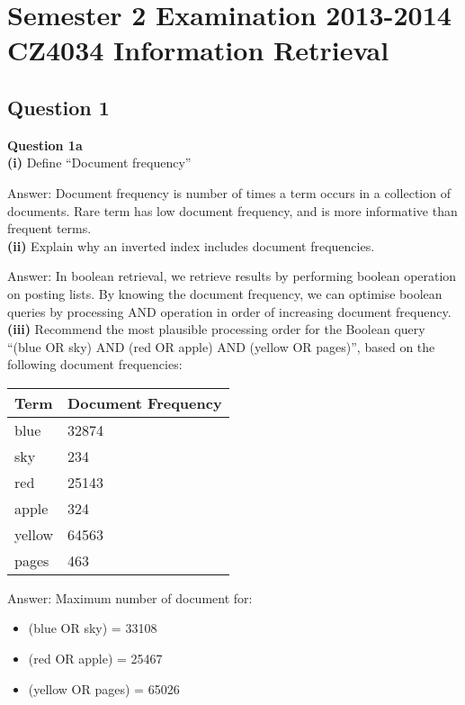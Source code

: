 \documentclass[11pt,a4paper]{report}
\begin{document}
\chapter{Semester 2 Examination 2013-2014\\CZ4034 Information Retrieval}

\begin{multicols*}{2}

\section{Question 1}

\noindent \textbf{Question 1a} \\

\noindent \textbf{(i)} Define ``Document frequency''

\noindent Answer: Document frequency is number of times a term occurs in a collection of documents. Rare term has low document frequency, and is more informative than frequent terms.\\

\noindent \textbf{(ii)} Explain why an inverted index includes document frequencies.

\noindent Answer: In boolean retrieval, we retrieve results by performing boolean operation on posting lists. By knowing the document frequency, we can optimise boolean queries by processing AND operation in order of increasing document frequency.\\

\noindent \textbf{(iii)} Recommend the most plausible processing order for the Boolean query ``(blue OR sky) AND (red OR apple) AND (yellow OR pages)'', based on the following document frequencies:

\begin{center}
\begin{tabular}{ | l | l |} 
    \hline
    Term  & Document Frequency\\
    \hline
    blue  & 32874 \\
    sky   & 234 \\
    red   & 25143 \\
    apple & 324 \\
    yellow& 64563 \\
    pages & 463 \\
    \hline
\end{tabular}
\end{center}

\noindent Answer: Maximum number of document for:
\begin{itemize}
    \item (blue OR sky) = 33108
    \item (red OR apple) = 25467
    \item (yellow OR pages) = 65026
\end{itemize}


\end{multicols*}
\end{document}
